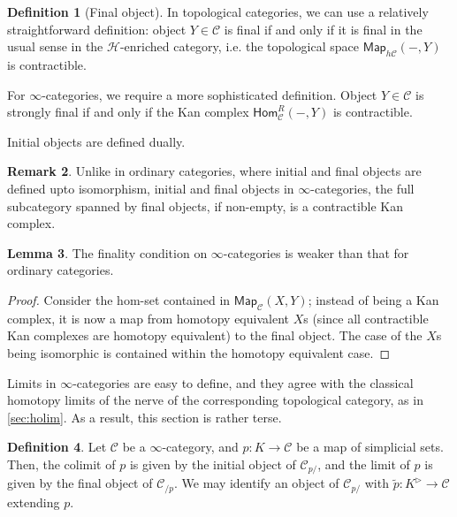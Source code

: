 \documentclass[10pt]{amsart}
\makeatletter
\newcommand{\8}{\ensuremath{\infty}}
\newcommand{\0}{\ensuremath{\overset{\rightarrow}{0}}}
\newcommand{\1}{\ensuremath{\mathbf{1}}}
\newcommand{\C}{\ensuremath{\mathscr{C}}}
\renewcommand{\H}{\ensuremath{\mathcal{H}}}
\newcommand{\Hom}{\ensuremath{\mathsf{Hom}}}
\newcommand{\Map}{\ensuremath{\mathsf{Map}}}
\theoremstyle{definition}
\newtheorem{definition}{Definition}[section]
\newtheorem{lemma}[definition]{Lemma}
\newtheorem{remark}[definition]{Remark}
\def\subsection{\@startsection{subsection}{2}
  \z@{.5\linespacing\@plus.7\linespacing}{.6\baselineskip}{\centering}}
\numberwithin{definition}{subsection}
\numberwithin{definition}{section}
\makeatother
\begin{document}
\begin{definition}[Final object]
  In topological categories, we can use a relatively straightforward definition: object $Y \in \C$ is final if and only if it is final in the usual sense in the \H-enriched category, i.e. the topological space $\Map_{h\C}(-, Y)$ is contractible.

  For \8-categories, we require a more sophisticated definition. Object $Y \in \C$ is strongly final if and only if the Kan complex $\Hom^R_\C(-, Y)$ is contractible.

  Initial objects are defined dually.
\end{definition}

\begin{remark}
  Unlike in ordinary categories, where initial and final objects are defined upto isomorphism, initial and final objects in \8-categories, the full subcategory spanned by final objects, if non-empty, is a contractible Kan complex.
\end{remark}

\begin{lemma}
  The finality condition on \8-categories is weaker than that for ordinary categories.
\end{lemma}

\begin{proof}
  Consider the hom-set contained in $\Map_\C(X, Y)$; instead of being a Kan complex, it is now a map from homotopy equivalent $X$s (since all contractible Kan complexes are homotopy equivalent) to the final object. The case of the $X$s being isomorphic is contained within the homotopy equivalent case.
\end{proof}

\subsection{Limits}
Limits in \8-categories are easy to define, and they agree with the classical homotopy limits of the nerve of the corresponding topological category, as in \ref{sec:holim}. As a result, this section is rather terse.

\begin{definition}
  Let $\C$ be a \8-category, and $p: K \rightarrow \C$ be a map of simplicial sets. Then, the colimit of $p$ is given by the initial object of $\C_{p/}$, and the limit of $p$ is given by the final object of $\C_{/p}$. We may identify an object of $\C_{p/}$ with $\tilde{p}: K^\triangleright \rightarrow \C$ extending $p$.
\end{definition}
\end{document}
